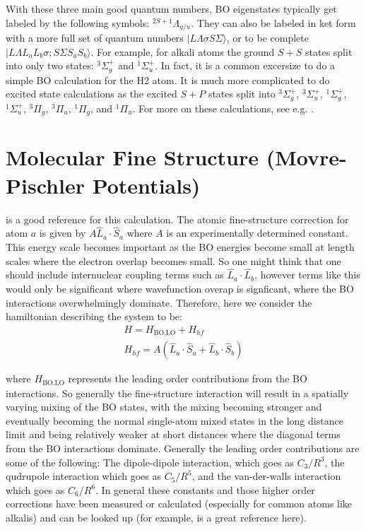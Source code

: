 \documentclass[prl, longbibliography]{revtex4-2}
\begin{document}
With these three main good quantum numbers, BO eigenstates typically get labeled by the following symbols: $^{2S+1}\Lambda_{g/u}$.
They can also be labeled in ket form with a more full set of quantum numbers $|L\Lambda\sigma S\Sigma\rangle$, or to be complete $|L\Lambda L_a L_b \sigma; S\Sigma S_a S_b\rangle$. 
For example, for alkali atoms the ground $S+S$ states split into only two states: $^3\Sigma^+_g$ and $^1\Sigma^+_u$. 
In fact, it is a common excersize to do a simple BO calculation for the H2 atom. It is much more complicated to do excited state calculations as the excited $S+P$ states split into $^3\Sigma^+_g$, $^3\Sigma^+_u$, $^1\Sigma^+_g$, $^1\Sigma^+_u$, $^3\Pi_g$, $^3\Pi_u$, $^1\Pi_g$, and $^1\Pi_u$. For more on these calculations, see e.g. \cite{magnier_potential_1993}. 

\section{Molecular Fine Structure (Movre-Pischler Potentials)}

\cite{bergeman_predissociations_2002} is a good reference for this calculation. The atomic fine-structure correction for atom $a$ is given by $A \hat{L}_a\cdot\hat{S}_a$ where $A$ is an experimentally determined constant. This energy scale becomes important as the BO energies become small at length scales where the electron overlap becomes small. So one might think that one should include internuclear coupling terms such as $\hat{L}_a\cdot\hat{L}_b$, however terms like this would only be significant where wavefunction overap is signficant, where the BO interactions overwhelmingly dominate. Therefore, here we consider the hamiltonian describing the system to be:
\begin{align}
H = H_{\text{BO,LO}} + H_{hf} \\
H_{hf}=A(\hat{L}_a\cdot\hat{S}_a+\hat{L}_b\cdot\hat{S}_b)
\end{align}

where $H_{\text{BO,LO}}$ represents the leading order contributions from the BO interactions. 
So generally the fine-structure interaction will result in a spatially varying mixing of the BO states, with the mixing becoming stronger and eventually becoming the normal single-atom mixed states in the long distance limit and being relatively weaker at short distances where the diagonal terms from the BO interactions dominate.
Generally the leading order contributions are some of the following: The dipole-dipole interaction, which goes as $C_3/R^3$, the qudrupole interaction which goes as $C_5/R^5$, and the van-der-walls interaction which goes as $C_6/R^6$. 
In general these constants and those higher order corrections have been measured or calculated (especially for common atoms like alkalis) and can be looked up (for example, \cite{marinescu_dispersion_1995} is a great reference here).
\end{document}

